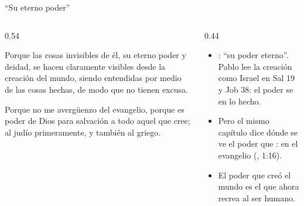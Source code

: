 \begin{frame}{``Su eterno poder''}
\begin{columns}[c,onlytextwidth]
\begin{column}{0.54\textwidth}
\begin{cita}Porque las cosas invisibles de él, su eterno poder y deidad, se hacen claramente visibles desde la creación del mundo, siendo entendidas por medio de las cosas hechas, de modo que no tienen excusa.\end{cita}
\begin{cita}Porque no me avergüenzo del evangelio, porque es poder de Dios para salvación a todo aquel que cree; al judío primeramente, y también al griego.\end{cita}
\end{column}
\begin{column}{0.44\textwidth}\small
\begin{itemize}
\item {}: ``su poder eterno''. Pablo lee la creación como Israel en Sal 19 y Job 38: el poder se  en lo hecho.
\item Pero el mismo capítulo dice dónde se ve el poder que : en el evangelio (, 1:16).
\item El poder que creó el mundo es el que ahora recrea al ser humano.
\end{itemize}
\end{column}
\end{columns}
\end{frame}

